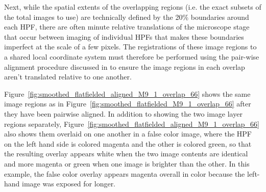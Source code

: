 \documentclass[letterpaper,11pt]{article}
\newcommand{\reffig}[1]{Figure~\ref{#1}}
\begin{document}
Next, while the spatial extents of the overlapping regions (i.e. the exact subsets of the total images to use) are technically defined by the 20\% boundaries around each HPF, there are often minute relative translations of the microscope stage that occur between imaging of individual HPFs that makes these boundaries imperfect at the scale of a few pixels. The registrations of these image regions to a shared local coordinate system must therefore be performed using the pair-wise alignment procedure discussed in \cite{Heshy} to ensure the image regions in each overlap aren't translated relative to one another. 

\reffig{fig:smoothed_flatfielded_aligned_M9_1_overlap_66} shows the same image regions as in \reffig{fig:smoothed_flatfielded_M9_1_overlap_66} after they have been pairwise aligned. In addition to showing the two image layer regions separately, \reffig{fig:smoothed_flatfielded_aligned_M9_1_overlap_66} also shows them overlaid on one another in a false color image, where the HPF on the left hand side is colored magenta and the other is colored green, so that the resulting overlay appears white when the two image contents are identical and more magenta or green when one image is brighter than the other. In this example, the false color overlay appears magenta overall in color because the left-hand image was exposed for longer.
\end{document}
